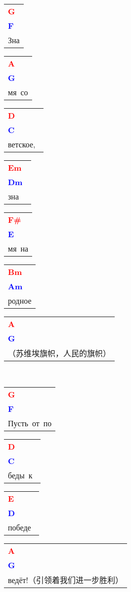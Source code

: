 \documentclass[12pt,a4paper,openany,UTF8]{memoir}
\begin{document}
\begin{tabular}[b]{l}
    \textbf{\textcolor{red}{G\ }}\\\textbf{\textcolor{blue}{F\ }}\\
    Зна\mbox{}\end{tabular}\begin{tabular}[b]{l}
    \textbf{\textcolor{red}{A\ }}\\\textbf{\textcolor{blue}{G\ }}\\
    мя~со\mbox{}\end{tabular}\begin{tabular}[b]{l}
    \textbf{\textcolor{red}{D\ }}\\\textbf{\textcolor{blue}{C\ }}\\
    ветское,~\mbox{}\end{tabular}\begin{tabular}[b]{l}
    \textbf{\textcolor{red}{Em\ }}\\\textbf{\textcolor{blue}{Dm\ }}\\
    зна\mbox{}\end{tabular}\begin{tabular}[b]{l}
    \textbf{\textcolor{red}{F\#\ }}\\\textbf{\textcolor{blue}{E\ }}\\
    мя~на\mbox{}\end{tabular}\begin{tabular}[b]{l}
    \textbf{\textcolor{red}{Bm\ }}\\\textbf{\textcolor{blue}{Am\ }}\\
    родное\mbox{}\end{tabular}\begin{tabular}[b]{l}
    \textbf{\textcolor{red}{A\ }}\\\textbf{\textcolor{blue}{G\ }}\\
    （苏维埃旗帜，人民的旗帜）\mbox{}\end{tabular}\\
\begin{tabular}[b]{l}
    \textbf{\textcolor{red}{G\ }}\\\textbf{\textcolor{blue}{F\ }}\\
    Пусть~от~по\mbox{}\end{tabular}\begin{tabular}[b]{l}
    \textbf{\textcolor{red}{D\ }}\\\textbf{\textcolor{blue}{C\ }}\\
    беды~к~\mbox{}\end{tabular}\begin{tabular}[b]{l}
    \textbf{\textcolor{red}{E\ }}\\\textbf{\textcolor{blue}{D\ }}\\
    победе~\mbox{}\end{tabular}\begin{tabular}[b]{l}
    \textbf{\textcolor{red}{A\ }}\\\textbf{\textcolor{blue}{G\ }}\\
    ведёт!（引领着我们进一步胜利）\mbox{}\end{tabular}
\end{document}
